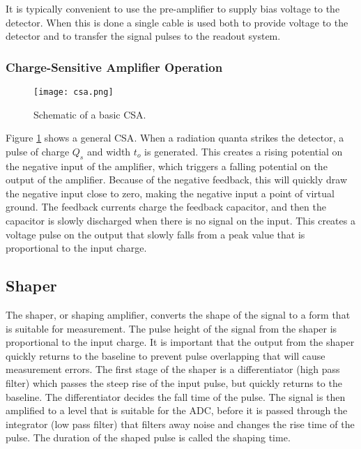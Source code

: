 \documentclass[../main/thesis.tex]{subfiles}
\begin{document}
It is typically convenient to use the pre-amplifier to supply bias voltage to the detector. When this is done a single cable is used both to provide voltage to the detector and to transfer the signal pulses to the readout system. \citep[chap. 16]{Knoll}

\subsubsection{Charge-Sensitive Amplifier Operation}
\label{t-csa}
\begin{figure}%
	\centering
	\texttt{[image: csa.png]}
	\caption{Schematic of a basic \gls{CSA}. \citep{Hamamatsu}}
	\label{fig-csa}
\end{figure}

Figure \ref{fig-csa} shows a general \gls{CSA}. When a radiation quanta strikes the detector, a pulse of charge $Q_s$ and width $t_o$ is generated. This creates a rising potential on the negative input of the amplifier, which triggers a falling potential on the output of the amplifier. Because of the negative feedback, this will quickly draw the negative input close to zero, making the negative input a point of virtual ground. The feedback currents charge the feedback capacitor, and then the capacitor is slowly discharged when there is no signal on the input. This creates a voltage pulse on the output that slowly falls from a peak value that is proportional to the input charge. \citep{Hamamatsu}

\subsection{Shaper}
\label{t-shaper}
The shaper, or shaping amplifier, converts the shape of the signal to a form that is suitable for measurement. The pulse height of the signal from the shaper is proportional to the input charge. It is important that the output from the shaper quickly returns to the baseline to prevent pulse overlapping that will cause measurement errors. The first stage of the shaper is a differentiator (high pass filter) which passes the steep rise of the input pulse, but quickly returns to the baseline. The differentiator decides the fall time of the pulse. The signal is then amplified to a level that is suitable for the \gls{ADC}, before it is passed through the integrator (low pass filter) that filters away noise and changes the rise time of the pulse. The duration of the shaped pulse is called the shaping time. \citep[chap. 16]{Knoll}
\end{document}
